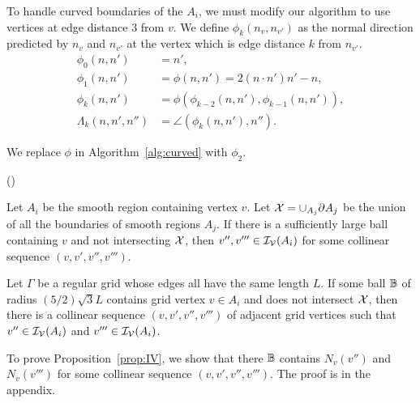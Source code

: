 To handle curved boundaries of the $A_i$,
we must modify our algorithm to use vertices 
at edge distance 3 from $v$.
We define $\phi_k(n_v,n_{v'})$ as the normal direction 
predicted by $n_v$ and $n_{v'}$ at the vertex 
which is edge distance $k$ from $n_{v'}$.
\begin{align*}
\phi_0(n,n') & = n', \\
\phi_1(n,n') & = \phi(n,n') = 2 (n \cdot n') n' - n, \\
\phi_k(n,n') & = \phi(\phi_{k-2}(n,n'),\phi_{k-1}(n,n')), \\
\Lambda_k(n,n',n'') & = \angle(\phi_k(n,n'),n'').
\end{align*}

We replace $\phi$ in Algorithm~\ref{alg:curved} with $\phi_2$.
\begin{algorithm}[h]
\BlankLine
{}
\Return(\true)
\caption{}
\label{alg:phi2}
\end{algorithm}

Let $A_i$ be the smooth region containing vertex $v$.
Let $\mathcal{X} = \cup_{A_j} \partial A_j$ be the union of all the boundaries
of smooth regions $A_j$.
If there is a sufficiently large ball containing $v$
and not intersecting $\mathcal{X}$, then $v'',v''' \in \mathcal{I_V}(A_i)$
for some collinear sequence $(v,v',v'',v''')$.
\begin{proposition}
Let $\Gamma$ be a regular grid whose edges all have the same length $L$.
If some ball $\mathbb{B}$ of radius $(5/2)\sqrt{3}L$ contains grid vertex $v \in A_i$
and does not intersect $\mathcal{X}$,
then there is a collinear sequence $(v,v',v'',v''')$ 
of adjacent grid vertices 
such that $v'' \in \mathcal{I_V}(A_i)$ and $v''' \in \mathcal{I_V}(A_i)$.
\label{prop:IV}
\end{proposition}

To prove Proposition~\ref{prop:IV}, 
we show that there $\mathbb{B}$ contains $N_v(v'')$ and $N_v(v''')$
for some collinear sequence $(v,v',v'',v''')$.
The proof is in the appendix.

